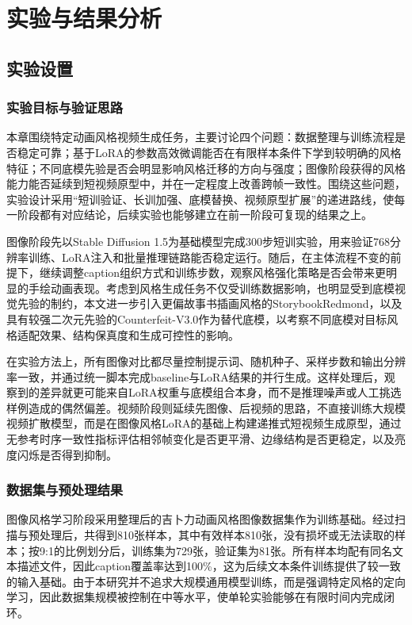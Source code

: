 
\chapter{实验与结果分析}

\section{实验设置}

\subsection{实验目标与验证思路}

本章围绕特定动画风格视频生成任务，主要讨论四个问题：数据整理与训练流程是否稳定可靠；基于LoRA的参数高效微调能否在有限样本条件下学到较明确的风格特征；不同底模先验是否会明显影响风格迁移的方向与强度；图像阶段获得的风格能力能否延续到短视频原型中，并在一定程度上改善跨帧一致性。围绕这些问题，实验设计采用“短训验证、长训加强、底模替换、视频原型扩展”的递进路线，使每一阶段都有对应结论，后续实验也能够建立在前一阶段可复现的结果之上。

图像阶段先以Stable Diffusion 1.5为基础模型完成300步短训实验，用来验证768分辨率训练、LoRA注入和批量推理链路能否稳定运行。随后，在主体流程不变的前提下，继续调整caption组织方式和训练步数，观察风格强化策略是否会带来更明显的手绘动画表现。考虑到风格生成任务不仅受训练数据影响，也明显受到底模视觉先验的制约，本文进一步引入更偏故事书插画风格的StorybookRedmond，以及具有较强二次元先验的Counterfeit-V3.0作为替代底模，以考察不同底模对目标风格适配效果、结构保真度和生成可控性的影响。

在实验方法上，所有图像对比都尽量控制提示词、随机种子、采样步数和输出分辨率一致，并通过统一脚本完成baseline与LoRA结果的并行生成。这样处理后，观察到的差异就更可能来自LoRA权重与底模组合本身，而不是推理噪声或人工挑选样例造成的偶然偏差。视频阶段则延续先图像、后视频的思路，不直接训练大规模视频扩散模型，而是在图像风格LoRA的基础上构建递推式短视频生成原型，通过无参考时序一致性指标评估相邻帧变化是否更平滑、边缘结构是否更稳定，以及亮度闪烁是否得到抑制。

\subsection{数据集与预处理结果}

图像风格学习阶段采用整理后的吉卜力动画风格图像数据集作为训练基础。经过扫描与预处理后，共得到810张样本，其中有效样本810张，没有损坏或无法读取的样本；按9:1的比例划分后，训练集为729张，验证集为81张。所有样本均配有同名文本描述文件，因此caption覆盖率达到100\%，这为后续文本条件训练提供了较一致的输入基础。由于本研究并不追求大规模通用模型训练，而是强调特定风格的定向学习，因此数据集规模被控制在中等水平，使单轮实验能够在有限时间内完成闭环。

